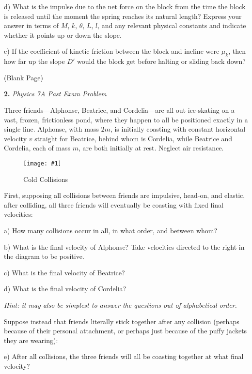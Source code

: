 \documentclass[11pt]{article}
\newcommand{\fig}[4]{
    \begin{figure}[H]
        \centering
        \texttt{[image: \#1]}
        \caption{#2}
        \label{exp4fit}
    \end{figure}
}
\theoremstyle{gangnamstyle}{\newtheorem{definition}{Definition}[]}
\theoremstyle{gangnamstyle}{\newtheorem{example}{Example}[]}
\theoremstyle{gangnamstyle}{\newtheorem{problem}{Problem}[]}
\begin{document}
d) What is the impulse due to the net force on the block from the time the block is released until the moment the spring reaches its natural length? Express your answer in terms of $M$, $k$, $\theta$, $L$, $l$, and any relevant physical constants and indicate whether it points up or down the slope.

e) If the coefficient of kinetic friction between the block and incline were $\mu_k$, then how far up the slope $D'$ would the block get before halting or sliding back down?

\pagebreak

\begin{center}
(Blank Page)
\end{center}

\pagebreak

\textbf{2.} \textit{Physics 7A Past Exam Problem}

Three friends---Alphonse, Beatrice, and Cordelia---are all out ice-skating on a vast, frozen, frictionless pond, where they happen to all be positioned exactly in a single line. Alphonse, with mass $2m$, is initially coasting with constant horizontal velocity $v$ straight for Beatrice, behind whom is Cordelia, while Beatrice and Cordelia, each of mass $m$, are both initially at rest. Neglect air resistance.

\fig{figs/mt2/charman1.png}{Cold Collisions}{0.7}{0}

First, supposing all collisions between friends are impulsive, head-on, and elastic, after colliding, all three friends will eventually be coasting with fixed final velocities:

a) How many collisions occur in all, in what order, and between whom?

b) What is the final velocity of Alphonse? Take velocities directed to the right in
the diagram to be positive.

c) What is the final velocity of Beatrice?

d) What is the final velocity of Cordelia?

\textit{Hint: it may also be simplest to answer the questions out of alphabetical order.}

Suppose instead that friends literally stick together after any collision (perhaps because of their personal attachment, or perhaps just because of the puffy jackets they are wearing):

e) After all collisions, the three friends will all be coasting together at what final velocity?
\end{document}
